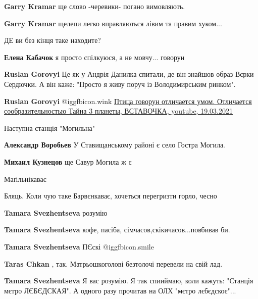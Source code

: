 \begin{itemize}
\begin{itemize} %
\textbf{Garry Kramar} ще слово -черевики- погано вимовляють.

\textbf{Garry Kramar} щелепи легко вправляються лівим та правим хуком...
\end{itemize} %

ДЕ ви без кінця таке находите?

\begin{itemize} %
\textbf{Елена Кабачок} я просто спілкуюся, а не мовчу... говорун

\textbf{Ruslan Gorovyi} Це як у Андрія Данилка спитали, де він знайшов образ Вєрки Сердючки. А він каже: "Просто я живу поруч із Володимирським ринком".

\textbf{Ruslan Gorovyi}  @igg{fbicon.wink} 
\href{https://youtu.be/A_elSrJbi1M}{%
Птица говорун отличается умом. Отличается сообразительностью Тайна 3 планеты, ВСТАВОЧКА, youtube, 19.03.2021%
}

\end{itemize} %

Наступна станція "Могильна"

\begin{itemize} %
\textbf{Александр Воробьев} У Ставищанському районі є село Гостра Могила.

\textbf{Михаил Кузнецов} ще Савур Могила ж є
\end{itemize} %

Маґільнікаває

Бляць. Коли чую таке Барвєнкаває, хочеться перегризти горло, чесно

\begin{itemize} %
\textbf{Tamara Svezhentseva} розумію

\textbf{Tamara Svezhentseva} кофе, пасіба, сімчасов,скікичасов...повбивав би.

\textbf{Tamara Svezhentseva} ПЄскі  @igg{fbicon.smile} 

\textbf{Taras Chkan} , так. Матрьошкоголові безтолочі перевели на свій лад.

\textbf{Tamara Svezhentseva} Я вас розумію. Я так спииймаю, коли кажуть: "Станція мєтро ЛЄБЄДСКАЯ".
А одного разу прочитав на ОЛХ "мєтро лєбєдскоє"...


\end{itemize}
\end{itemize}
